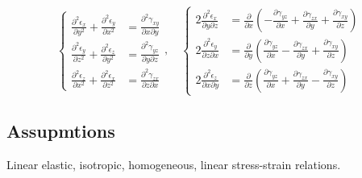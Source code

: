 \documentclass[en,hazy,cyan,8pt,normal]{elegantnote}
\numberwithin{equation}{section}
\begin{document}
  \begin{equation}\label{eq:053}
    \left\{
      \begin{aligned}
        \frac{\partial^2 \epsilon_x}{\partial y^2} + \frac{\partial^2 \epsilon_y}{\partial x^2} &= \frac{\partial^2 \gamma_{xy}}{\partial x \partial y} \\
        \frac{\partial^2 \epsilon_y}{\partial z^2} + \frac{\partial^2 \epsilon_z}{\partial y^2} &= \frac{\partial^2 \gamma_{yz}}{\partial y \partial z} \\
        \frac{\partial^2 \epsilon_z}{\partial x^2} + \frac{\partial^2 \epsilon_x}{\partial z^2} &= \frac{\partial^2 \gamma_{zx}}{\partial z \partial x}
      \end{aligned}
    \right.
    , \quad
    \left\{
      \begin{aligned}
        2 \frac{\partial^2 \epsilon_x}{\partial y \partial z} &= \frac{\partial}{\partial x} \left( -\frac{\partial \gamma_{yz}}{\partial x} + \frac{\partial \gamma_{zx}}{\partial y} + \frac{\partial \gamma_{xy}}{\partial z} \right) \\
        2 \frac{\partial^2 \epsilon_y}{\partial z \partial x} &= \frac{\partial}{\partial y} \left( \frac{\partial \gamma_{yz}}{\partial x} - \frac{\partial \gamma_{zx}}{\partial y} + \frac{\partial \gamma_{xy}}{\partial z} \right) \\
        2 \frac{\partial^2 \epsilon_z}{\partial x \partial y} &= \frac{\partial}{\partial z} \left( \frac{\partial \gamma_{yz}}{\partial x} + \frac{\partial \gamma_{zx}}{\partial y} - \frac{\partial \gamma_{xy}}{\partial z} \right)
      \end{aligned}
    \right.
  \end{equation}

  \subsection{Assupmtions}
  Linear elastic, isotropic, homogeneous, linear stress-strain relations.

  
\end{document}
